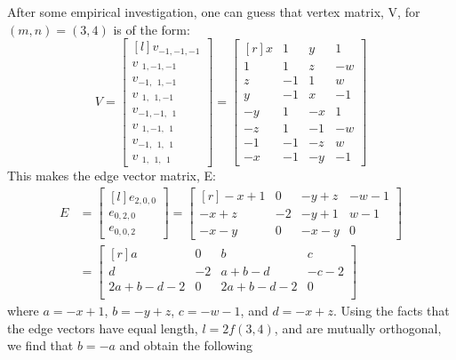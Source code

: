 \documentclass[superscriptaddress,reprint,amsmath,amssymb,aps]{revtex4-1}
\begin{document}
After some empirical investigation, one can guess that vertex matrix, V, for
$(m,n) = (3,4)$ is of the form:
\begin{equation*}
V =
\begin{bmatrix*}[l]
v_{ -1, -1, -1} \\
v_{~~1, -1, -1} \\
v_{ -1,~~1, -1} \\
v_{~~1,~~1, -1} \\
v_{ -1, -1,~~1} \\
v_{~~1, -1,~~1} \\
v_{ -1,~~1,~~1} \\
v_{~~1,~~1,~~1}
\end{bmatrix*}
=
\begin{bmatrix*}[r]
   x &  1 &  y &  1 \\
   1 &  1 &  z & -w \\
   z & -1 &  1 &  w \\
   y & -1 &  x & -1 \\
  -y &  1 & -x &  1 \\
  -z &  1 & -1 & -w \\
  -1 & -1 & -z &  w \\
  -x & -1 & -y & -1
\end{bmatrix*}
\end{equation*}
This makes the edge vector matrix, E:
\begin{align*}
E &=
\begin{bmatrix*}[l]
e_{2,0,0} \\
e_{0,2,0} \\
e_{0,0,2}
\end{bmatrix*}
=  
\begin{bmatrix*}[r]
-x + 1 &  0 & -y + z & -w - 1 \\
-x + z & -2 & -y + 1 &  w - 1 \\
-x - y &  0 & -x - y &      0
\end{bmatrix*}
\\
&=  
\begin{bmatrix*}[r]
a        &  0 & b        &  c   \\
d        & -2 & a+b-d    & -c-2 \\
2a+b-d-2 &  0 & 2a+b-d-2 &  0   \\
\end{bmatrix*}
\end{align*}
where $a = -x+1$, $b = -y+z$, $c = -w-1$, and $d = -x+z$.
Using the facts that the edge vectors have equal length, $l = 2 f(3,4)$, and
are mutually orthogonal, we find that $b = -a$ and obtain the following
\end{document}
